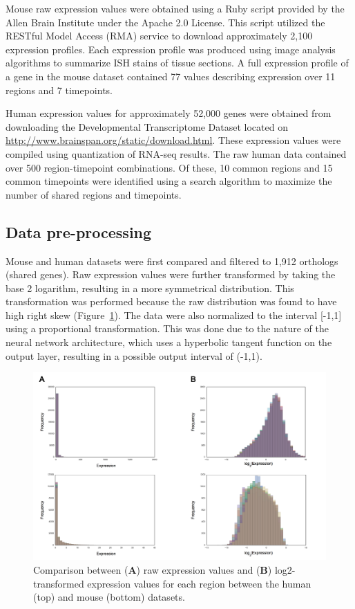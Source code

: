 \documentclass[12pt,oneside,onecolumn,a4paper]{article}
\begin{document}
Mouse raw expression values were obtained using a Ruby script provided by the Allen Brain Institute under the Apache 2.0 License. This script utilized the RESTful Model Access (RMA) service to download approximately 2,100 expression profiles. Each expression profile was produced using image analysis algorithms to summarize ISH stains of tissue sections. A full expression profile of a gene in the mouse dataset contained 77 values describing expression over 11 regions and 7 timepoints. 

Human expression values for approximately 52,000 genes were obtained from downloading the Developmental Transcriptome Dataset located on \url{http://www.brainspan.org/static/download.html}. These expression values were compiled using quantization of RNA-seq results. The raw human data contained over 500 region-timepoint combinations. Of these, 10 common regions and 15 common timepoints were identified using a search algorithm to maximize the number of shared regions and timepoints.

\subsection{Data pre-processing}

Mouse and human datasets were first compared and filtered to 1,912 orthologs (shared genes). Raw expression values were further transformed by taking the base 2 logarithm, resulting in a more symmetrical distribution. This transformation was performed because the raw distribution was found to have high right skew (Figure~\ref{fig:log2}). The data were also normalized to the interval [-1,1] using a proportional transformation. This was done due to the nature of the neural network architecture, which uses a hyperbolic tangent function on the output layer, resulting in a possible output interval of (-1,1).

\begin{figure}[H]
\begin{center}
\includegraphics[width=\columnwidth]{figures/log2}
\caption{Comparison between (\textbf{A}) raw expression values and (\textbf{B}) log2-transformed expression values for each region between the human (top) and mouse (bottom) datasets. \label{fig:log2}%
}
\end{center}
\end{figure}
\end{document}
